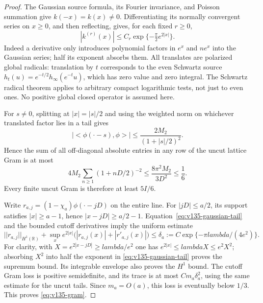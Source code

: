 \documentclass[11pt]{article}
\def\lambda{lambda}%
\def\norm#1{||#1||}%
\def\ip#1#2{<#1,#2>}%
\theoremstyle{remark}
\newcommand{\norm}[1]{\left\lVert #1\right\rVert}
\newcommand{\ip}[2]{\left\langle #1,#2\right\rangle}
\begin{document}
\begin{proof}
The Gaussian source formula, its Fourier invariance, and Poisson
summation give $k(-x)=k(x)\ne0$.  Differentiating its normally
convergent series on $x\ge0$, and then reflecting, gives, for each
fixed $r\ge0$,
\begin{equation}\label{eq:v135-gaussian-tail}
 |k^{(r)}(x)|\le C_r\exp\{-\tfrac\pi2 e^{2|x|}\}.
\end{equation}
Indeed a derivative only introduces polynomial factors in $e^x$ and
$ne^x$ into the Gaussian series; half its exponent absorbs them.
All translates are polarized global radicals: translation by $t$
corresponds to the even Schwartz source
$h_t(u)=e^{-t/2}h_\infty(e^{-t}u)$, which has zero value and zero
integral.  The Schwartz radical theorem applies to arbitrary compact
logarithmic tests, not just to even ones.  No positive global closed
operator is assumed here.

For $s\ne0$, splitting at $|x|=|s|/2$ and using the weighted norm
on whichever translated factor lies in a tail gives
\[
 |\ip{\phi(\cdot-s)}\phi|
 \le\frac{2M_2}{(1+|s|/2)^2}.
\]
Hence the sum of all off-diagonal absolute entries in any row of
the uncut lattice Gram is at most
\[
 4M_2\sum_{n\ge1}(1+nD/2)^{-2}
 \le\frac{8\pi^2M_2}{3D^2}\le\frac16.
\]
Every finite uncut Gram is therefore at least $5I/6$.

Write $r_{a,j}=(1-\chi_a)\phi(\cdot-jD)$ on the entire line.
For $|jD|\le a/2$, its support satisfies $|x|\ge a-1$, hence
$|x-jD|\ge a/2-1$.  Equation~\eqref{eq:v135-gaussian-tail} and
the bounded cutoff derivatives imply the uniform estimate
\begin{equation}\label{eq:v135-weighted-tail}
 \norm{r_{a,j}}_{H^1(\mathbb R)}+
 \sup_x e^{2|x|}\bigl(|r_{a,j}(x)|+|r'_{a,j}(x)|\bigr)
 \le\delta_a:=C\exp\{-\pi\lambda/(4e^2)\}.
\end{equation}
For clarity, with $X=e^{2|x-jD|}\ge\lambda/e^2$ one has
$e^{2|x|}\le\lambda X\le e^2X^2$; absorbing $X^2$ into half
the exponent in \eqref{eq:v135-gaussian-tail} proves the supremum
bound.  Its integrable envelope also proves the $H^1$ bound.
The cutoff Gram loss is positive semidefinite, and its trace is
at most $Cm_a\delta_a^2$, using the same estimate for the
uncut tails.  Since $m_a=O(a)$, this loss is eventually below $1/3$.
This proves \eqref{eq:v135-gram}.


\end{proof}
\end{document}
